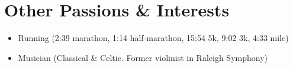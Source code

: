 \documentclass[a4paper,10pt]{article} %
\begin{document}
\FloatBarrier


\section{Other Passions \& Interests}

\begin{itemize}
  \item Running (2:39 marathon, 1:14 half-marathon, 15:54 5k, 9:02 3k, 4:33 mile)
  \item Musician (Classical \& Celtic. Former violinist in Raleigh Symphony)
\end{itemize}

\end{document}
